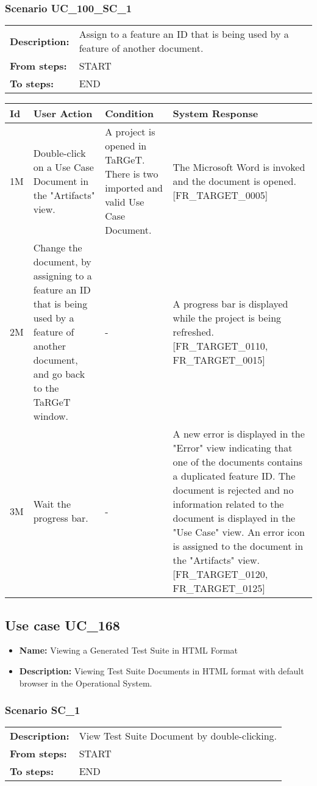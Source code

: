 \documentclass[a4paper,11pt]{article}
\newcommand{\bl}{\\ \hline}
\begin{document}
\subsubsection*{Scenario UC_100_SC_1}
\begin{tabular}{p{1in}p{4in}}
{\bf Description:} & Assign to a feature an ID that is being used by a feature of another document. \\
{\bf From steps:} & START \\
{\bf To steps:} & END \\
\end{tabular}
 
\begin{tabular}{|p{0.8in}|p{1.6in}|p{1.6in}|p{1.6in}|}
\hline
Id & User Action & Condition & System Response  \bl 
1M & Double-click on a Use Case Document in the "Artifacts" view. & A project is opened in TaRGeT. There is two imported and valid Use Case Document. & The Microsoft Word is invoked and the document is opened. [FR_TARGET_0005] \bl 
2M & Change the document, by assigning to a feature an ID that is being used by a feature of another document, and go back to the TaRGeT window. & - & A progress bar is displayed while the project is being refreshed. [FR_TARGET_0110, FR_TARGET_0015] \bl 
3M & Wait the progress bar. & - & A new error is displayed in the "Error" view indicating that one of the documents contains a duplicated feature ID. The document is rejected and no information related to the document is displayed in the "Use Case" view. An error icon is assigned to the document in the "Artifacts" view. [FR_TARGET_0120, FR_TARGET_0125] \bl 
\end{tabular}
\subsection*{Use case UC_168}
\begin{itemize}
\item {\bf Name: }Viewing a Generated Test Suite in HTML Format
\item {\bf Description: } Viewing Test Suite Documents in HTML format with
	    default browser in the Operational System.
\end{itemize}
\subsubsection*{Scenario SC_1}
\begin{tabular}{p{1in}p{4in}}
{\bf Description:} & View Test Suite Document by double-clicking.
	     \\
{\bf From steps:} & START \\
{\bf To steps:} & END \\
\end{tabular}
 
\end{document}
